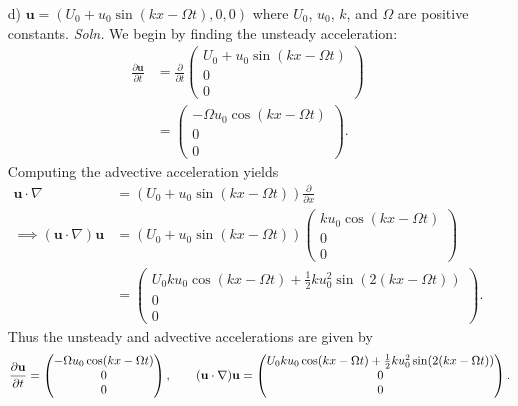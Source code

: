 \documentclass{article}
\begin{document}
\begin{itemize}
\begin{itemize}
        \item[d)] $\mathbf{u} = (U_0 + u_0\sin(kx - \Omega t),0,0)$ where $U_0$, $u_0$, $k$, and $\Omega$ are positive constants.
        \newline\newline
        \textit{Soln.} We begin by finding the unsteady acceleration:
        \begin{align*}
            \frac{\partial \mathbf{u}}{\partial t} &= \frac{\partial}{\partial t}\begin{pmatrix}
                U_0 + u_0\sin(kx - \Omega t)\\
                0\\
                0
            \end{pmatrix}\\
            &= \begin{pmatrix}
                -\Omega u_0\cos(kx - \Omega t)\\
                0\\
                0
            \end{pmatrix}.
        \end{align*}
        Computing the advective acceleration yields
        \begin{align*}
            \mathbf{u}\cdot\nabla &= (U_0 + u_0\sin(kx - \Omega t))\frac{\partial}{\partial x}\\
            \implies (\mathbf{u}\cdot\nabla)\mathbf{u} &= (U_0 + u_0\sin(kx - \Omega t))\begin{pmatrix}
                ku_0\cos(kx - \Omega t)\\
                0\\
                0
            \end{pmatrix}\\
            &= \begin{pmatrix}
                U_0ku_0\cos(kx - \Omega t) + \frac{1}{2}ku_0^2\sin(2(kx - \Omega t))\\
                0\\
                0
            \end{pmatrix}.
        \end{align*}
        Thus the unsteady and advective accelerations are given by
            \[\frac{\partial \mathbf{u}}{\partial t} = \begin{pmatrix}
                -\Omega u_0 \cos(kx - \Omega t)\\
                0\\
                0
            \end{pmatrix}, \hspace{0.7cm} (\mathbf{u}\cdot\nabla)\mathbf{u} = \begin{pmatrix}
                U_0ku_0\cos(kx - \Omega t) + \frac{1}{2}ku_0^2\sin(2(kx - \Omega t))\\
                0\\
                0
            \end{pmatrix}.\]
    \end{itemize}



\end{itemize}
\end{document}
